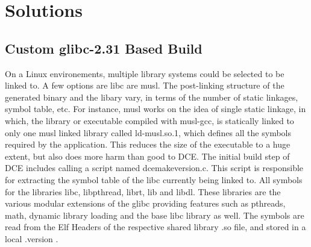 \documentclass{sig-alternate}
\begin{document}
\section{Solutions}
\label{section:design}

\subsection{Custom glibc-2.31 Based Build}
On a Linux environements, multiple library systems could be selected to be linked to. A few options are libc are musl. The post-linking structure
of the generated binary and the libary vary, in terms of the number of static linkages, symbol table, etc. For instance, musl works on the idea of
single static linkage, in which, the library or executable compiled with musl-gcc, is statically linked to only one musl linked library called 
ld-musl.so.1, which defines all the symbols required by the application. This reduces the size of the executable to a huge extent, but 
also does more harm than good to DCE. The initial build step of DCE includes calling a script named dcemakeversion.c. This script is responsible 
for extracting the symbol table of the libc currently being linked to. All symbols for the libraries libc, libpthread, librt, lib and libdl. These 
libraries are the various modular extensions of the glibc providing features such as pthreads, math, dynamic library loading and the base libc 
library as well. The symbols are read from the Elf Headers of the respective shared library .so file, and stored in a local .version .
\end{document}
